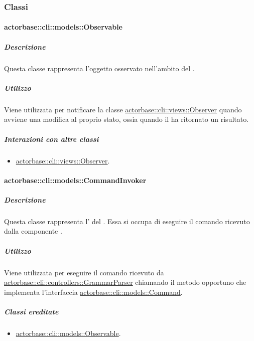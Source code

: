 \documentclass{scalatekids-article}
\begin{document}
\subsubsection{Classi}

\paragraph{actorbase::cli::models::Observable}
\label{sec:actorbase::cli::models::Observable}

\subparagraph{Descrizione}

Questa classe rappresenta l'oggetto osservato nell'ambito del  .

\subparagraph{Utilizzo}

Viene utilizzata per notificare la classe \hyperref[sec:actorbase::cli::views::Observer]{actorbase::cli::views::Observer}
quando avviene una modifica al proprio stato, ossia quando il 
ha ritornato un risultato.

\subparagraph{Interazioni con altre classi}

\begin{itemize}
\item \hyperref[sec:actorbase::cli::views::Observer]{actorbase::cli::views::Observer}.
\end{itemize}

\paragraph{actorbase::cli::models::CommandInvoker}
\label{sec:actorbase::cli::models::CommandInvoker}

\subparagraph{Descrizione}

Questa classe rappresenta l' del . Essa
si occupa di eseguire il comando ricevuto dalla componente .

\subparagraph{Utilizzo}

Viene utilizzata per eseguire il comando ricevuto da
\hyperref[sec:actorbase::cli::controllers::GrammarParser]{actorbase::cli::controllers::GrammarParser} chiamando il metodo opportuno che
implementa l'interfaccia \hyperref[sec:actorbase::cli::models::Command]{actorbase::cli::models::Command}.

\subparagraph{Classi ereditate}

\begin{itemize}
\item \hyperref[sec:actorbase::cli::models::Observable]{actorbase::cli::models::Observable}.
\end{itemize}
\end{document}
